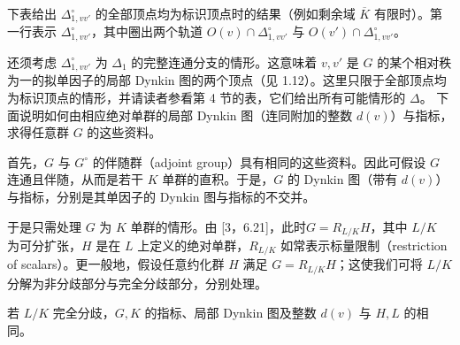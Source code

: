 下表给出 $\Delta_{1,vv'}^\circ$ 的全部顶点均为标识顶点时的结果（例如剩余域 $\overline K$ 有限时）。第一行表示 $\Delta_{1,vv'}^\circ$，其中圈出两个轨道 $O(v)\cap\Delta_{1,vv'}^\circ$ 与 $O(v')\cap\Delta_{1,vv'}^\circ$。
\begin{center}\end{center}
还须考虑 $\Delta_{1,vv'}^\circ$ 为 $\Delta_1$ 的完整连通分支的情形。这意味着 $v,v'$ 是 $G$ 的某个相对秩为一的拟单因子的局部 Dynkin 图的两个顶点（见 1.12）。这里只限于全部顶点均为标识顶点的情形，并请读者参看第 4 节的表，它们给出所有可能情形的 $\Delta$。
下面说明如何由相应绝对单群的局部 Dynkin 图（连同附加的整数 $d(v)$）与指标，求得任意群 $G$ 的这些资料。

首先，$G$ 与 $G^\circ$ 的伴随群（adjoint group）具有相同的这些资料。因此可假设 $G$ 连通且伴随，从而是若干 $K$ 单群的直积。于是，$G$ 的 Dynkin 图（带有 $d(v)$）与指标，分别是其单因子的 Dynkin 图与指标的不交并。

于是只需处理 $G$ 为 $K$ 单群的情形。由 [3，6.21]，此时$G=R_{L/K}H$，其中 $L/K$ 为可分扩张，$H$ 是在 $L$ 上定义的绝对单群，$R_{L/K}$ 如常表示标量限制（restriction of scalars）。更一般地，假设任意约化群 $H$ 满足 $G=R_{L/K}H$；这使我们可将 $L/K$ 分解为非分歧部分与完全分歧部分，分别处理。

若 $L/K$ 完全分歧，$G,K$ 的指标、局部 Dynkin 图及整数 $d(v)$ 与 $H,L$ 的相同。

